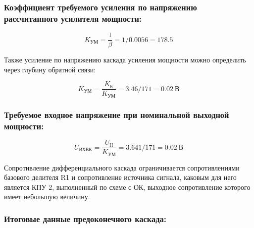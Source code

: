\subsubsection{	Коэффициент требуемого усиления по напряжению рассчитанного усилителя мощности:}

\begin{equation}
\label{eq:equation4_21}
K_{\text{УМ}}=\dfrac{1}{\beta}=1/0.0056=178.5
\end{equation}

Также усиление по напряжению каскада усиления мощности можно определить через глубину обратной связи:

\begin{equation}
\label{eq:equation4_22}
K_{\text{УМ}}=\dfrac {K_{\text{Е}}}{K_{\text{УМ}}}=3.46/171=0.02~\text{В}
\end{equation}

\subsubsection{Требуемое входное напряжение при номинальной выходной мощности:} %


\begin{equation}
\label{eq:equation4_22}
U_{\text{ВХВК}}=\dfrac {U_{\text{Н}}}{K_{\text{УМ}}}=3.641/171=0.02 ~\text{В}
\end{equation}

Сопротивление дифференциального каскада ограничивается сопротивлениями базового делителя R1 и сопротивление источника сигнала, каковым для него является КПУ 2, выполненный по схеме с ОК, выходное сопротивление которого имеет небольшую величину.
\subsubsection{	Итоговые данные предоконечного каскада:	}
